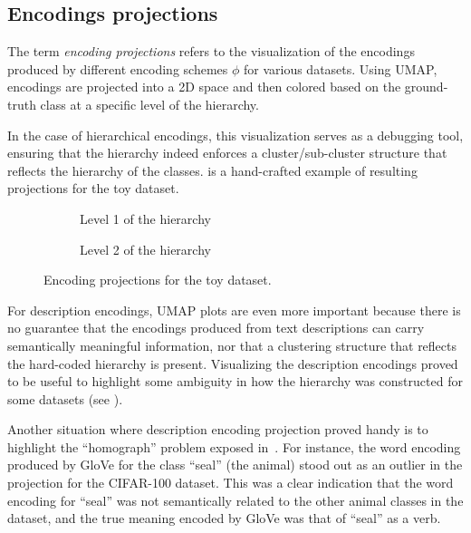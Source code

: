 \subsection{Encodings projections}
\label{subsec:encodings-projections}
The term \emph{encoding projections} refers to the visualization of the encodings produced by different encoding schemes $\phi$ for various datasets. Using UMAP, encodings are projected into a 2D space and then colored based on the ground-truth class at a specific level of the hierarchy.

In the case of hierarchical encodings, this visualization serves as a debugging tool, ensuring that the hierarchy indeed enforces a cluster/sub-cluster structure that reflects the hierarchy of the classes.  is a hand-crafted example of resulting projections for the toy dataset.

\begin{figure}[h]
  \centering
  \begin{subfigure}{0.45\textwidth}
    \caption{Level 1 of the hierarchy}
    \label{fig:04/hierarchical-encodings-projections-lvl1}
  \end{subfigure}
  \begin{subfigure}{0.45\textwidth}
    \caption{Level 2 of the hierarchy}
    \label{fig:04/hierarchical-encodings-projections-lvl2}
  \end{subfigure}
  \caption{Encoding projections for the toy dataset.}
  \label{fig:04/hierarchical-encodings-projections}
\end{figure}

For description encodings, UMAP plots are even more important because there is no guarantee that the encodings produced from text descriptions can carry semantically meaningful information, nor that a clustering structure that reflects the hard-coded hierarchy is present. Visualizing the description encodings proved to be useful to highlight some ambiguity in how the hierarchy was constructed for some datasets (see ).

Another situation where description encoding projection proved handy is to highlight the ``homograph'' problem exposed in~. For instance, the word encoding produced by GloVe for the class ``seal'' (the animal) stood out as an outlier in the projection for the CIFAR-100 dataset. This was a clear indication that the word encoding for ``seal'' was not semantically related to the other animal classes in the dataset, and the true meaning encoded by GloVe was that of ``seal'' as a verb.

